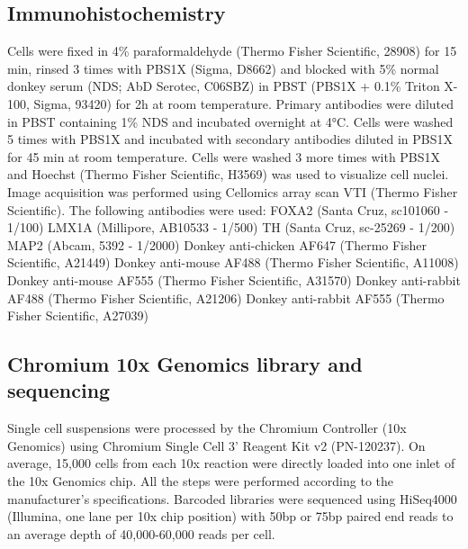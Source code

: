 \subsection{Immunohistochemistry}
Cells were fixed in 4\% paraformaldehyde (Thermo Fisher Scientific, 28908) for 15 min, rinsed 3 times with PBS1X (Sigma, D8662) and blocked with 5\% normal donkey serum (NDS; AbD Serotec, C06SBZ) in PBST (PBS1X + 0.1\% Triton X-100, Sigma, 93420) for 2h at room temperature. Primary antibodies were diluted in PBST containing 1\% NDS and incubated overnight at 4°C.
Cells were washed 5 times with PBS1X and incubated with secondary antibodies diluted in PBS1X for 45 min at room temperature.  
Cells were washed 3 more times with PBS1X and Hoechst (Thermo Fisher Scientific, H3569) was used to visualize cell nuclei. Image acquisition was performed using Cellomics array scan VTI (Thermo Fisher Scientific).
The following antibodies were used: 
FOXA2 (Santa Cruz, sc101060 - 1/100)
LMX1A (Millipore, AB10533 - 1/500)
TH (Santa Cruz, sc-25269 - 1/200)
MAP2 (Abcam, 5392 - 1/2000)
Donkey anti-chicken AF647 (Thermo Fisher Scientific, A21449)
Donkey anti-mouse AF488 (Thermo Fisher Scientific, A11008)
Donkey anti-mouse AF555 (Thermo Fisher Scientific, A31570)
Donkey anti-rabbit AF488 (Thermo Fisher Scientific, A21206)
Donkey anti-rabbit AF555 (Thermo Fisher Scientific, A27039)

\subsection{Chromium 10x Genomics library and sequencing}
Single cell suspensions were processed by the Chromium Controller (10x Genomics) using Chromium Single Cell 3’ Reagent Kit v2 (PN-120237). 
On average, 15,000 cells from each 10x reaction were directly loaded into one inlet of the 10x Genomics chip. 
All the steps were performed according to the manufacturer's specifications. 
Barcoded libraries were sequenced using HiSeq4000 (Illumina, one lane per 10x chip position) with 50bp or 75bp paired end reads to an average depth of 40,000-60,000 reads per cell.